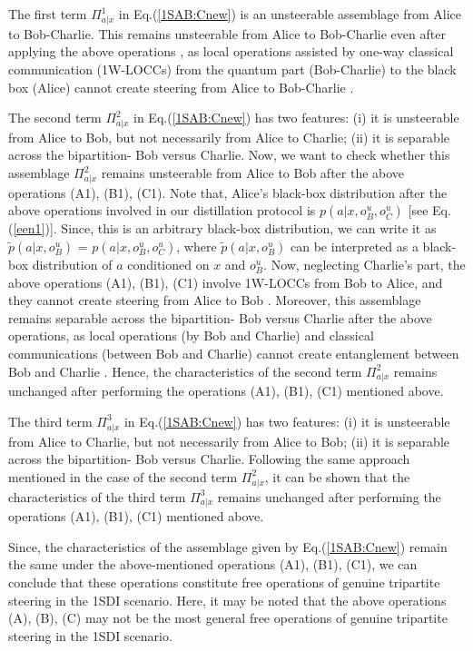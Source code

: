 \documentclass[reprint,superscriptaddress,nofootinbib,amsmath,amssymb,aps,pra,longbibliography]{revtex4-1}
\begin{document}
\begin{widetext}
The first term $\Pi^1_{a|x}$ in Eq.(\ref{1SAB:Cnew}) is an unsteerable assemblage from  Alice to Bob-Charlie. This remains unsteerable from Alice to Bob-Charlie even after applying the above operations  \cite{Nery20}, as local operations assisted by one-way classical communication (1W-LOCCs) from the quantum part (Bob-Charlie) to the black box (Alice) cannot create steering from Alice to Bob-Charlie \cite{Rodrigo15}.


The second term $\Pi^2_{a|x}$ in Eq.(\ref{1SAB:Cnew}) has two features: (i) it is unsteerable from Alice to Bob, but not necessarily from Alice to Charlie; (ii)  it is separable across the bipartition- Bob versus Charlie. Now, we want to check whether this assemblage $\Pi^2_{a|x}$ remains unsteerable from Alice to Bob after the above operations  (A1), (B1), (C1). Note that, Alice's black-box distribution after the above operations involved in our distillation protocol is $p(a|x, o^u_B, o^u_C)$ [see Eq.(\ref{een1})]. Since, this is an arbitrary black-box distribution, we can write it as $\tilde{p}(a|x, o^u_B)$ = $p(a|x, o^u_B, o^u_C)$, where $\tilde{p}(a|x, o^u_B)$ can be interpreted as a black-box distribution of $a$ conditioned on $x$ and $o^u_B$. Now, neglecting Charlie's part, the above operations  (A1), (B1), (C1) involve  1W-LOCCs from Bob to Alice, and they cannot create steering from Alice to Bob \cite{Rodrigo15}. Moreover, this assemblage remains separable across the bipartition- Bob versus Charlie after the above operations, as local operations (by Bob and Charlie) and classical communications (between Bob and Charlie) cannot create entanglement between Bob and Charlie \cite{Horo09}. Hence, the characteristics of the second term $\Pi^2_{a|x}$ remains unchanged after performing the operations  (A1), (B1), (C1) mentioned above.

The third term $\Pi^3_{a|x}$ in Eq.(\ref{1SAB:Cnew}) has two features:  (i) it is unsteerable from Alice to Charlie, but not necessarily from Alice to Bob; (ii) it is separable across the bipartition- Bob versus Charlie. Following the same approach mentioned in the case of the second term $\Pi^2_{a|x}$, it can be shown that the characteristics of the third term $\Pi^3_{a|x}$ remains unchanged after performing the operations  (A1), (B1), (C1) mentioned above.

Since, the characteristics of the assemblage given by Eq.(\ref{1SAB:Cnew}) remain the same under the above-mentioned operations (A1), (B1), (C1), we can conclude that these operations constitute free operations of genuine tripartite steering in the 1SDI scenario.
Here, it may be noted that the above operations (A), (B), (C) may not be the most general free operations of genuine tripartite steering in the 1SDI scenario.
 

\end{widetext}
\end{document}
